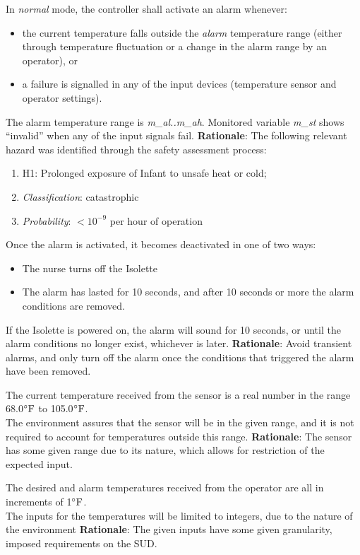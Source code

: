 \documentclass[fontsize=12pt,paper=letter,twoside]{scrartcl}
\begin{document}
{In \emph{normal} mode, the controller shall activate an alarm whenever:
\begin{itemize}
    \item the current temperature falls outside the \emph{alarm} temperature range (either through temperature fluctuation or a change in the alarm range by an operator), or
    \item a failure is signalled in any of the input devices (temperature sensor and operator settings).\\
\end{itemize}}
{The alarm temperature range is \emph{m\_al..m\_ah}. Monitored variable \emph{m\_st} shows ``invalid'' when any of the input signals fail.}
\label{R3}
\textbf{Rationale}: The following relevant hazard was identified through the safety assessment process:
\begin{enumerate}
    \item H1: Prolonged exposure of Infant to unsafe heat or cold;
    \item \emph{Classification}: catastrophic
    \item \emph{Probability}: $<10^{-9}$ per hour of operation
\end{enumerate}

{Once the alarm is activated, it becomes deactivated in one of two ways:
\begin{itemize}
\item The nurse turns off the Isolette
\item The alarm has lasted for 10 seconds, and after 10 seconds or more the alarm conditions are removed. \\
\end{itemize}}
{If the Isolette is powered on, the alarm will sound for 10 seconds, or until the alarm conditions no longer exist, whichever is later.}
\label{R4}
\textbf{Rationale}: Avoid transient alarms, and only turn off the alarm once the conditions that triggered the alarm have been removed.

{The current temperature received from the sensor is a real number in the range 68.0$^{\circ}\mathrm{F}$ to 105.0$^{\circ}\mathrm{F}$.\\}
{The environment assures that the sensor will be in the given range, and it is not required to account for temperatures outside this range.}
\label{E5}
\textbf{Rationale}: The sensor has some given range due to its nature, which allows for restriction of the expected input.

{The desired and alarm temperatures received from the operator are all in increments of 1$^{\circ}\mathrm{F}$.\\}
{The inputs for the temperatures will be limited to integers, due to the nature of the environment}
\label{E6}
\textbf{Rationale}: The given inputs have some given granularity, imposed requirements on the SUD.
\end{document}
